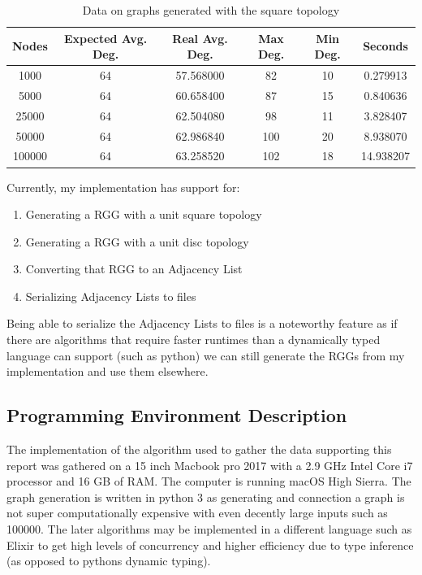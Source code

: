 \documentclass{article}
\begin{document}
	\begin{center}
	  \begin{table}[H]
			\begin{tabular}{ |c|c|c|c|c|c| }
				\hline
				Nodes & Expected Avg. Deg. & Real Avg. Deg. & Max Deg. & Min Deg. & Seconds \\
        \hline
        1000 & 64 & 57.568000 & 82 & 10 & 0.279913 \\
        \hline
        5000 & 64 & 60.658400 & 87 & 15 & 0.840636 \\
        \hline
        25000 & 64 & 62.504080 & 98 & 11 & 3.828407 \\
        \hline
        50000 & 64 & 62.986840 & 100 & 20 & 8.938070 \\
        \hline
        100000 & 64 & 63.258520 & 102 & 18 & 14.938207 \\
        \hline

			\end{tabular}
			\caption{Data on graphs generated with the square topology}
		\end{table}
	\end{center}

  Currently, my implementation has support for:
  \begin{enumerate}
    \item Generating a RGG with a unit square topology
    \item Generating a RGG with a unit disc topology
    \item Converting that RGG to an Adjacency List
    \item Serializing Adjacency Lists to files
  \end{enumerate}
  Being able to serialize the Adjacency Lists to files is a noteworthy feature as if there are algorithms that require faster runtimes than a dynamically typed language can support (such as python) we can still generate the RGGs from my implementation and use them elsewhere.

  \subsection{Programming Environment Description}
  	The implementation of the algorithm used to gather the data supporting this report was gathered on a 15 inch Macbook pro 2017 with a 2.9 GHz Intel Core i7 processor and 16 GB of RAM.
    The computer is running macOS High Sierra.
    The graph generation is written in python 3 as generating and connection a graph is not super computationally expensive with even decently large inputs such as 100000.
    The later algorithms may be implemented in a different language such as Elixir to get high levels of concurrency and higher efficiency due to type inference (as opposed to pythons dynamic typing).
\end{document}
